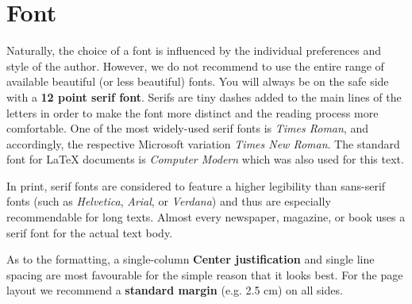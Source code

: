 \section{Font}

Naturally, the choice of a font is influenced by the individual preferences and style
of the author. However, we do not recommend to use the entire range of available beautiful
(or less beautiful) fonts. You will always be on the safe side with a \textbf{12 point
serif font}. Serifs are tiny dashes added to the main lines of the letters in order to
make the font more distinct and the reading process more comfortable. One of the most
widely-used serif fonts is \emph{Times Roman}, and accordingly, the respective Microsoft
variation \emph{Times New Roman}. The standard font for LaTeX documents is \emph{Computer Modern}
which was also used for this text.

In print, serif fonts are considered to feature a higher legibility than sans-serif
fonts (such as \emph{Helvetica}, \emph{Arial}, or \emph{Verdana}) and thus are especially
recommendable for long texts. Almost every newspaper, magazine, or book uses a serif font for
the actual text body.

As to the formatting, a single-column \textbf{Center justification} and single line spacing
are most favourable for the simple reason that it looks best. For the page layout we recommend
a \textbf{standard margin} (e.g. 2.5 cm) on all sides.
